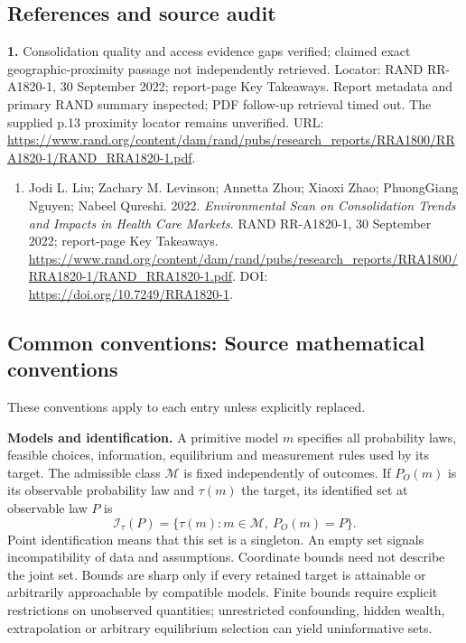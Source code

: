 \documentclass[11pt,a4paper]{article}
\begin{document}
\subsection*{References and source audit}
\textbf{1.} Consolidation quality and access evidence gaps verified; claimed exact geographic-proximity passage not independently retrieved. Locator: RAND RR-A1820-1, 30 September 2022; report-page Key Takeaways. Report metadata and primary RAND summary inspected; PDF follow-up retrieval timed out. The supplied p.13 proximity locator remains unverified. URL: \url{https://www.rand.org/content/dam/rand/pubs/research_reports/RRA1800/RRA1820-1/RAND_RRA1820-1.pdf}.
\begin{enumerate}\raggedright
\item\hypertarget{definitions:source:30007722:1}{} Jodi L. Liu; Zachary M. Levinson; Annetta Zhou; Xiaoxi Zhao; PhuongGiang Nguyen; Nabeel Qureshi. 2022. \emph{Environmental Scan on Consolidation Trends and Impacts in Health Care Markets}. RAND RR-A1820-1, 30 September 2022; report-page Key Takeaways.
\url{https://www.rand.org/content/dam/rand/pubs/research_reports/RRA1800/RRA1820-1/RAND_RRA1820-1.pdf}.
DOI: \url{https://doi.org/10.7249/RRA1820-1}.
\end{enumerate}

\subsection*{Common conventions: Source mathematical conventions}

These conventions apply to each entry unless explicitly replaced.

\textbf{Models and identification.} A primitive model \(m\) specifies all probability laws, feasible choices, information, equilibrium and measurement rules used by its target. The admissible class \(\mathcal M\) is fixed independently of outcomes. If \(P_O(m)\) is its observable probability law and \(\tau(m)\) the target, its identified set at observable law \(P\) is
\[
 \mathcal I_\tau(P)=\{\tau(m):m\in\mathcal M,\ P_O(m)=P\}.
\]
Point identification means that this set is a singleton. An empty set signals incompatibility of data and assumptions. Coordinate bounds need not describe the joint set. Bounds are sharp only if every retained target is attainable or arbitrarily approachable by compatible models. Finite bounds require explicit restrictions on unobserved quantities; unrestricted confounding, hidden wealth, extrapolation or arbitrary equilibrium selection can yield uninformative sets.
\end{document}
